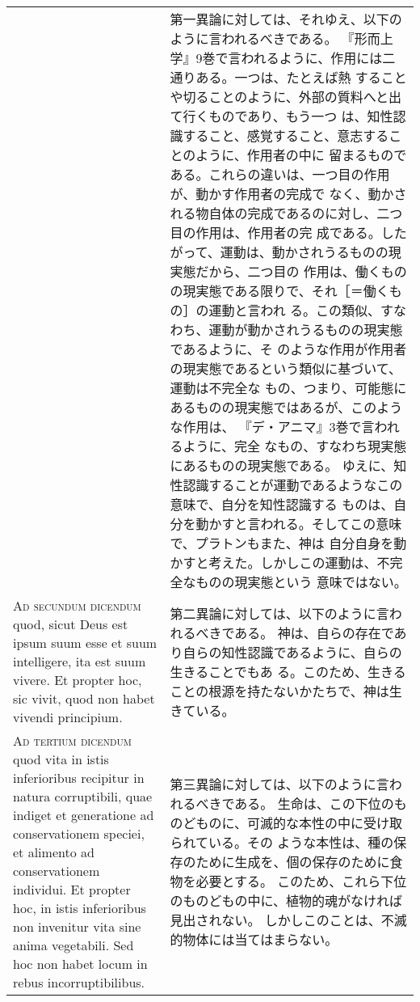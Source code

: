 \documentclass[10pt]{jsarticle} %
\begin{document}
\begin{longtable}{p{21em}p{21em}}
&

第一異論に対しては、それゆえ、以下のように言われるべきである。
『形而上学』9巻で言われるように、作用には二通りある。一つは、たとえば熱
 することや切ることのように、外部の質料へと出て行くものであり、もう一つ
 は、知性認識すること、感覚すること、意志することのように、作用者の中に
 留まるものである。これらの違いは、一つ目の作用が、動かす作用者の完成で
 なく、動かされる物自体の完成であるのに対し、二つ目の作用は、作用者の完
 成である。したがって、運動は、動かされうるものの現実態だから、二つ目の
 作用は、働くものの現実態である限りで、それ［＝働くもの］の運動と言われ
 る。この類似、すなわち、運動が動かされうるものの現実態であるように、そ
 のような作用が作用者の現実態であるという類似に基づいて、運動は不完全な
 もの、つまり、可能態にあるものの現実態ではあるが、このような作用は、
 『デ・アニマ』3巻で言われるように、完全
 なもの、すなわち現実態にあるものの現実態である。
ゆえに、知性認識することが運動であるようなこの意味で、自分を知性認識する
 ものは、自分を動かすと言われる。そしてこの意味で、プラトンもまた、神は
 自分自身を動かすと考えた。しかしこの運動は、不完全なものの現実態という
 意味ではない。

\\


{\scshape Ad secundum dicendum} quod, sicut Deus est ipsum suum esse et
suum intelligere, ita est suum vivere. Et propter hoc, sic vivit, quod
non habet vivendi principium.


&

第二異論に対しては、以下のように言われるべきである。
神は、自らの存在であり自らの知性認識であるように、自らの生きることでもあ
 る。このため、生きることの根源を持たないかたちで、神は生きている。


\\


{\scshape Ad tertium dicendum} quod vita in istis inferioribus recipitur
in natura corruptibili, quae indiget et generatione ad conservationem
speciei, et alimento ad conservationem individui. Et propter hoc, in
istis inferioribus non invenitur vita sine anima vegetabili. Sed hoc non
habet locum in rebus incorruptibilibus.


&

第三異論に対しては、以下のように言われるべきである。
生命は、この下位のものどものに、可滅的な本性の中に受け取られている。その
 ような本性は、種の保存のために生成を、個の保存のために食物を必要とする。
 このため、これら下位のものどもの中に、植物的魂がなければ見出されない。
 しかしこのことは、不滅的物体には当てはまらない。



\end{longtable}
\newpage
\end{document}
